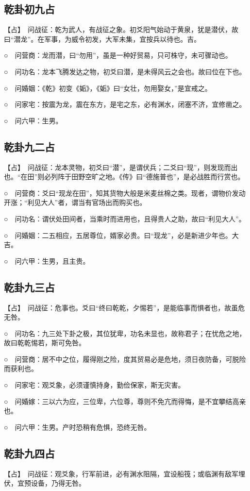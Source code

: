 \documentclass[12pt,oneside]{book}
\begin{document}
\subsection{乾卦初九占}
【占】　问战征：乾为武人，有战征之象。初爻阳气始动于黄泉，犹是潜伏，故曰“潜龙”。在军事，为威令初发，大军未集，宜按兵以待也。吉。

○　问营商：龙而潜，曰“勿用”，虽是一种好贸易，只可株守，未可骤动也。

○　问功名：龙本飞腾发达之物，初爻曰潜，是未得风云之会也。故曰位在下也。

○　问婚姻：《乾》初变《姤》，《姤》曰“女壮，勿用娶女，”是宜戒之。

○　问家宅：按震为龙，震在东方，是宅之东，必有渊水，闭塞不济，宜修凿之。

○　问六甲：生男。

\subsection{乾卦九二占}
【占】　问战征：龙本灵物，初爻曰“潜”，是谓伏兵；二爻曰“现”，则发现而出也。“在田”则必列阵于田野空旷之地。《传》曰“德施普也”，是必战胜而行赏也。

○　问营商：爻曰“现龙在田”，知其货物大般是米麦丝棉之类。现者，谓物价发动开涨；“利见大人”者，谓当有官场出而购买也。

○　问功名：谓伏处田间者，当乘时而进用也，且得贵人之助，故曰“利见大人”。

○　问婚姻：二五相应，五居尊位，婿家必贵。曰“现龙”，必是新进少年也。大吉。

○　问六甲：生男，且主贵。


\subsection{乾卦九三占}
【占】　问战征：危事也。爻曰“终曰乾乾，夕惕若”，是能临事而惧者也，故虽危无咎。

○　问功名：九三处下卦之极，其位犹卑，功名未显也，故称君子；在忧危之地，故曰乾乾惕若，斯可免咎。

○　问营商：居不中之位，履得刚之险，度其贸易必是危地，须日夜防备，可脱险而获利也。

○　问家宅：观爻象，必须谨慎持身，勤俭保家，斯无灾害。

○　问婚嫁：三以六为应，三位卑，六位尊，尊则不免亢而得悔，是不宜攀结高亲也。

○　问六甲：生男。产时恐稍有危惧，恐终无咎。


\subsection{乾卦九四占}
【占】　问战征：观爻象，行军前进，必有渊水阻隔，宜设船筏；或临渊有敌军埋伏，宜预设备，乃得无咎。
\end{document}
